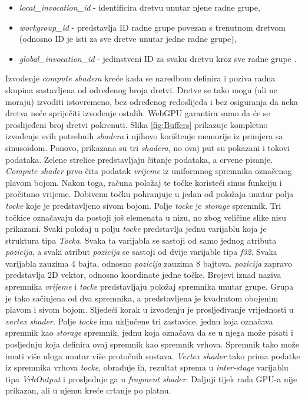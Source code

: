 \documentclass{foi}
\begin{document}
\begin{itemize}
	\item \textit{local\_invocation\_id} - identificira dretvu unutar njene radne grupe,
	\item \textit{workgroup\_id} - predstavlja ID radne grupe povezan s trenutnom dretvom (odnosno ID je isti za sve dretve unutar jedne radne grupe),
	\item \textit{global\_invocation\_id} - jedinstveni ID za svaku dretvu kroz sve radne grupe \parencite{WebGPUFundamentalsMemoryLayout}.
\end{itemize}
Izvođenje \textit{compute shadera} kreće kada se naredbom definira i poziva radna skupina sastavljena od određenog broja dretvi. Dretve se tako mogu (ali ne moraju) izvoditi istovremeno, bez određenog redoslijeda i bez osiguranja da neka dretva neće spriječiti izvođenje ostalih. WebGPU garantira samo da će se proslijeđeni broj dretvi pokrenuti. Slika \ref{fig:Buffers} prikazuje kompletno izvođenje svih potrebnih \textit{shadera} i njihovo korištenje memorije iz primjera sa sinusoidom. Ponovo, prikazana su tri \textit{shadera}, no ovaj put su pokazani i tokovi podataka. Zelene strelice predstavljaju čitanje podataka, a crvene pisanje. \textit{Compute shader} prvo čita podatak \textit{vrijeme} iz uniformnog spremnika označenog plavom bojom. Nakon toga, računa položaj te točke koristeći sinus funkciju i pročitano vrijeme. Dobivenu točku pohranjuje u jedan od položaja unutar polja \textit{tocke} koje je predstavljeno sivom bojom. Polje \textit{tocke} je \textit{storage} spremnik. Tri točkice označavaju da postoji još elemenata u nizu, no zbog veličine slike nisu prikazani. Svaki položaj u polju \textit{tocke} predstavlja jednu varijablu koja je struktura tipa \textit{Tocka}. Svaka ta varijabla se sastoji od samo jednog atributa \textit{pozicija}, a svaki atribut \textit{pozicija} se sastoji od dvije varijable tipa \textit{f32}. Svaka varijabla zauzima 4 bajta, odnosno \textit{pozicija} zauzima 8 bajtova. \textit{pozicija} zapravo predstavlja 2D vektor, odnosno koordinate jedne točke. Brojevi iznad naziva spremnika \textit{vrijeme} i \textit{tocke} predstavljaju položaj spremnika unutar grupe. Grupa je tako sačinjena od dva spremnika, a predstavljena je kvadratom obojenim plavom i sivom bojom. Sljedeći korak u izvođenju je prosljeđivanje vrijednosti u \textit{vertex shader}. Polje \textit{tocke} ima uključene tri zastavice, jednu koja označava spremnik kao \textit{storage} spremnik, jednu koja označava da se u njega može pisati i posljednju koja definira ovaj spremnik kao spremnik vrhova. Spremnik tako može imati više uloga unutar više protočnih sustava. \textit{Vertex shader} tako prima podatke iz spremnika vrhova \textit{tocke}, obrađuje ih, rezultat sprema u \textit{inter-stage} varijablu tipa \textit{VrhOutput} i prosljeđuje ga u \textit{fragment shader}. Daljnji tijek rada GPU-a nije prikazan, ali u njemu kreće crtanje po platnu.
\end{document}
